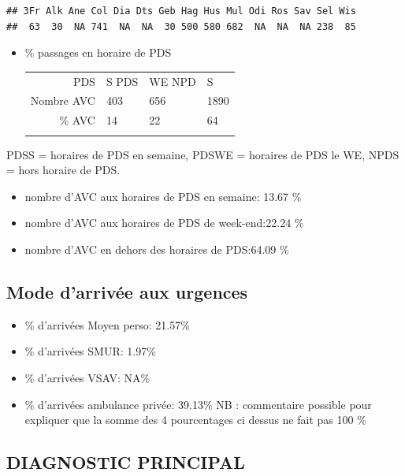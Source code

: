 \documentclass[]{article}
\begin{document}
\begin{verbatim}
## 3Fr Alk Ane Col Dia Dts Geb Hag Hus Mul Odi Ros Sav Sel Wis 
##  63  30  NA 741  NA  NA  30 500 580 682  NA  NA  NA 238  85
\end{verbatim}

\begin{itemize}
\item
  \% passages en horaire de PDS

  \begin{longtable}[c]{@{}rlll@{}}
  \toprule\addlinespace
  PDS & S PDS & WE NPD & S
  \\\addlinespace
  \midrule\endhead
  Nombre AVC & 403 & 656 & 1890
  \\\addlinespace
  \% AVC & 14 & 22 & 64
  \\\addlinespace
  \bottomrule
  \end{longtable}
\end{itemize}

PDSS = horaires de PDS en semaine, PDSWE = horaires de PDS le WE, NPDS =
hors horaire de PDS.

\begin{itemize}
\itemsep1pt\parskip0pt
\item
  nombre d'AVC aux horaires de PDS en semaine: 13.67 \%
\item
  nombre d'AVC aux horaires de PDS de week-end:22.24 \%
\item
  nombre d'AVC en dehors des horaires de PDS:64.09 \%
\end{itemize}

\subsection{Mode d'arrivée aux
urgences}\label{mode-darrivee-aux-urgences}

\begin{itemize}
\itemsep1pt\parskip0pt
\item
  \% d'arrivées Moyen perso: 21.57\%
\item
  \% d'arrivées SMUR: 1.97\%
\item
  \% d'arrivées VSAV: NA\%
\item
  \% d'arrivées ambulance privée: 39.13\% NB : commentaire possible pour
  expliquer que la somme des 4 pourcentages ci dessus ne fait pas 100 \%
\end{itemize}

\subsection{DIAGNOSTIC PRINCIPAL}\label{diagnostic-principal-1}
\end{document}
